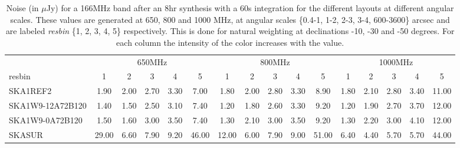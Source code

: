 \begin{table}[!htp]
{{\begin{tabular}{|lccccc||ccccc||ccccc|}
 \tabularnewline \cline{2-16} \multicolumn{1}{c}{ } & \multicolumn{5}{|c}{650MHz}  & \multicolumn{5}{c}{800MHz}  & \multicolumn{5}{c|}{1000MHz} \tabularnewline \cline{1-16} 
 resbin  &1 & 2 & 3 & 4 & 5 & 1 & 2 & 3 & 4 & 5 & 1 & 2 & 3 & 4 & 5 \tabularnewline \hline
SKA1REF2 & 1.90 \cellcolor{blue!18.76} & 2.00 \cellcolor{red!22.12} & 2.70 \cellcolor{green!19.56} & 3.30 \cellcolor{orange!19.38} & 7.00 \cellcolor{purple!18.00} & 1.80 \cellcolor{blue!20.33} & 2.00 \cellcolor{red!20.00} & 2.80 \cellcolor{green!19.58} & 3.30 \cellcolor{orange!18.00} & 8.90 \cellcolor{purple!18.00} & 1.80 \cellcolor{blue!22.85} & 2.10 \cellcolor{red!21.36} & 2.80 \cellcolor{green!19.40} & 3.40 \cellcolor{orange!18.00} & 11.00 \cellcolor{purple!18.00}\\ \hline 
SKA1W9-12A72B120 & 1.40 \cellcolor{blue!18.00} & 1.50 \cellcolor{red!18.00} & 2.50 \cellcolor{green!18.00} & 3.10 \cellcolor{orange!18.00} & 7.40 \cellcolor{purple!18.43} & 1.20 \cellcolor{blue!18.00} & 1.80 \cellcolor{red!18.00} & 2.60 \cellcolor{green!18.00} & 3.30 \cellcolor{orange!18.00} & 9.20 \cellcolor{purple!18.30} & 1.20 \cellcolor{blue!18.00} & 1.90 \cellcolor{red!18.00} & 2.70 \cellcolor{green!18.00} & 3.70 \cellcolor{orange!23.48} & 12.00 \cellcolor{purple!19.27}\\ \hline 
SKA1W9-0A72B120 & 1.50 \cellcolor{blue!18.15} & 1.60 \cellcolor{red!18.82} & 3.00 \cellcolor{green!21.89} & 3.50 \cellcolor{orange!20.75} & 7.40 \cellcolor{purple!18.43} & 1.30 \cellcolor{blue!18.39} & 2.10 \cellcolor{red!21.00} & 3.00 \cellcolor{green!21.17} & 3.50 \cellcolor{orange!19.47} & 9.20 \cellcolor{purple!18.30} & 1.30 \cellcolor{blue!18.81} & 2.20 \cellcolor{red!23.04} & 3.00 \cellcolor{green!22.20} & 4.10 \cellcolor{orange!30.78} & 12.00 \cellcolor{purple!19.27}\\ \hline 
SKASUR & 29.00 \cellcolor{blue!60.00} & 6.60 \cellcolor{red!60.00} & 7.90 \cellcolor{green!60.00} & 9.20 \cellcolor{orange!60.00} & 46.00 \cellcolor{purple!60.00} & 12.00 \cellcolor{blue!60.00} & 6.00 \cellcolor{red!60.00} & 7.90 \cellcolor{green!60.00} & 9.00 \cellcolor{orange!60.00} & 51.00 \cellcolor{purple!60.00} & 6.40 \cellcolor{blue!60.00} & 4.40 \cellcolor{red!60.00} & 5.70 \cellcolor{green!60.00} & 5.70 \cellcolor{orange!60.00} & 44.00 \cellcolor{purple!60.00}\tabularnewline \hline 
\end{tabular}}\hfil 

\caption{Noise (in $\mu$Jy) for a 166MHz band after an 8hr synthesis with a 60s integration for the different layouts at different angular scales. These values are generated at 650, 800 and 1000 MHz, at angular scales \{0.4-1, 1-2, 2-3, 3-4, 600-3600\} arcsec and are labeled {\it resbin} \{1, 2, 3, 4, 5\} respectively. This is done for natural weighting at declinations -10, -30 and -50 degrees. For each column the intensity of the color increases with the value.}\label{tab:noise166-band1}}
 \end{table}